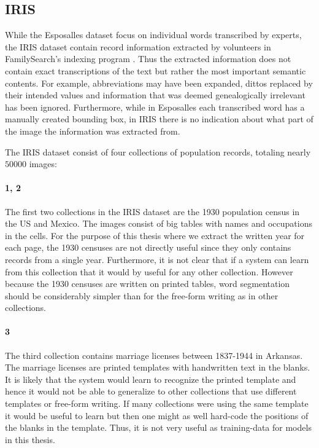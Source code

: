 \subsection{IRIS}

While the Esposalles dataset focus on individual words transcribed by experts, the IRIS dataset contain record information extracted by volunteers in FamilySearch's indexing program \cite{Iris}.
Thus the extracted information does not contain exact transcriptions of the text but rather the most important semantic contents.
For example, abbreviations may have been expanded, dittos replaced by their intended values and information that was deemed genealogically irrelevant has been ignored.
Furthermore, while in Esposalles each transcribed word has a manually created bounding box, in IRIS there is no indication about what part of the image the information was extracted from.

The IRIS dataset consist of four collections of population records, totaling nearly $50000$ images:

\paragraph{1, 2}
The first two collections in the IRIS dataset are the 1930 population census in the US and Mexico. The images consist of big tables with names and occupations in the cells.
For the purpose of this thesis where we extract the written year for each page, the 1930 censuses are not directly useful since they only contains records from a single year. Furthermore, it is not clear that if a system can learn from this collection that it would by useful for any other collection.
However because the 1930 censuses are written on printed tables, word segmentation should be considerably simpler than for the free-form writing as in other collections.

\paragraph{3}
The third collection contains marriage licenses between 1837-1944 in Arkansas. The marriage licenses are printed templates with handwritten text in the blanks.
It is likely that the system would learn to recognize the printed template and hence it would not be able to generalize to other collections that use different templates or free-form writing. If many collections were using the same template it would be useful to learn but then one might as well hard-code the positions of the blanks in the template. Thus, it is not very useful as training-data for models in this thesis.

